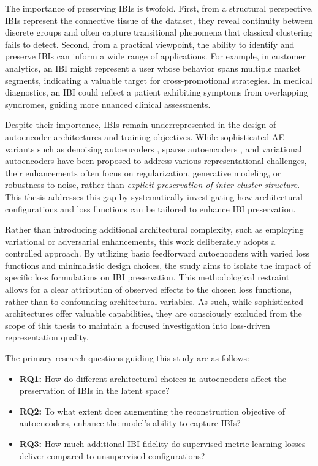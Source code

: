 The importance of preserving IBIs is twofold. First, from a structural perspective, IBIs represent the connective tissue of the dataset, they reveal continuity between discrete groups and often capture transitional phenomena that classical clustering fails to detect. Second, from a practical viewpoint, the ability to identify and preserve IBIs can inform a wide range of applications. For example, in customer analytics, an IBI might represent a user whose behavior spans multiple market segments, indicating a valuable target for cross-promotional strategies. In medical diagnostics, an IBI could reflect a patient exhibiting symptoms from overlapping syndromes, guiding more nuanced clinical assessments.

Despite their importance, IBIs remain underrepresented in the design of autoencoder architectures and training objectives. While sophisticated AE variants such as denoising autoencoders \cite{Vincent08}, sparse autoencoders \cite{Ng11}, and variational autoencoders \cite{Kingma13} have been proposed to address various representational challenges, their enhancements often focus on regularization, generative modeling, or robustness to noise, rather than \textit{explicit preservation of inter-cluster structure}. This thesis addresses this gap by systematically investigating how architectural configurations and loss functions can be tailored to enhance IBI preservation.

Rather than introducing additional architectural complexity, such as employing variational or adversarial enhancements, this work deliberately adopts a controlled approach. By utilizing basic feedforward autoencoders with varied loss functions and minimalistic design choices, the study aims to isolate the impact of specific loss formulations on IBI preservation. This methodological restraint allows for a clear attribution of observed effects to the chosen loss functions, rather than to confounding architectural variables. As such, while sophisticated architectures offer valuable capabilities, they are consciously excluded from the scope of this thesis to maintain a focused investigation into loss-driven representation quality.

The primary research questions guiding this study are as follows:

\begin{itemize}
    \item \textbf{RQ1:} How do different architectural choices in autoencoders affect the preservation of IBIs in the latent space?
    \item \textbf{RQ2:} To what extent does augmenting the reconstruction objective of autoencoders, enhance the model's ability to capture IBIs?
    \item \textbf{RQ3:} How much additional IBI fidelity do supervised metric-learning losses deliver compared to unsupervised configurations?
\end{itemize}

